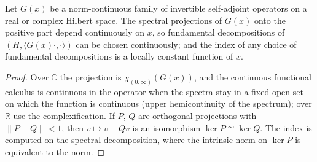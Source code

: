 \begin{theorem}
  \label{thm:kr-perturbation}
  \leanok
  Let $G(x)$ be a norm-continuous family of invertible self-adjoint operators on a real or complex
  Hilbert space. The spectral projections of $G(x)$ onto the positive part depend continuously on
  $x$, so fundamental decompositions of $(H, \langle G(x)\cdot, \cdot\rangle)$ can be chosen
  continuously; and the index of any choice of fundamental decompositions is a locally constant
  function of $x$.
\end{theorem}

\begin{proof}
  \leanok
  Over $\mathbb{C}$ the projection is $\chi_{(0,\infty)}(G(x))$, and the continuous functional
  calculus is continuous in the operator when the spectra stay in a fixed open set on which the
  function is continuous (upper hemicontinuity of the spectrum); over $\mathbb{R}$ use the
  complexification. If $P$, $Q$ are orthogonal projections with $\|P - Q\| < 1$, then
  $v \mapsto v - Qv$ is an isomorphism $\ker P \cong \ker Q$. The index is computed on the
  spectral decomposition, where the intrinsic norm on $\ker P$ is equivalent to the norm.
\end{proof}
